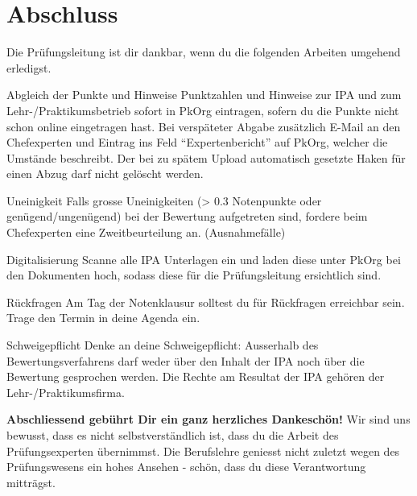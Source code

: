 \section{Abschluss}
Die Prüfungsleitung ist dir dankbar, wenn du die folgenden Arbeiten umgehend erledigst.

\begin{taskitemwithoutcomment}{Abgleich der Punkte und Hinweise}
  Punktzahlen und Hinweise zur IPA und zum Lehr-/Praktikumsbetrieb sofort in PkOrg eintragen, sofern du die Punkte nicht schon online eingetragen hast. Bei verspäteter Abgabe zusätzlich E-Mail an den Chefexperten und Eintrag ins Feld \enquote{Expertenbericht} auf PkOrg, welcher die Umstände beschreibt. Der bei zu spätem Upload automatisch gesetzte Haken für einen Abzug darf nicht gelöscht werden.
\end{taskitemwithoutcomment}
\begin{taskitemwithoutcomment}{Uneinigkeit}
  Falls grosse Uneinigkeiten (> 0.3 Notenpunkte oder genügend/ungenügend) bei der Bewertung aufgetreten sind, fordere beim Chefexperten eine Zweitbeurteilung an. (Ausnahmefälle)
\end{taskitemwithoutcomment}
\begin{taskitemwithoutcomment}{Digitalisierung}
  Scanne alle IPA Unterlagen ein und laden diese unter PkOrg bei den Dokumenten hoch, sodass diese für die Prüfungsleitung ersichtlich sind.
\end{taskitemwithoutcomment}
\begin{taskitemwithoutcomment}{Rückfragen}
  Am Tag der Notenklausur solltest du für Rückfragen erreichbar sein. Trage den Termin in deine Agenda ein.
\end{taskitemwithoutcomment}
\begin{taskitemwithoutcomment}{Schweigepflicht}
  Denke an deine Schweigepflicht: Ausserhalb des Bewertungsverfahrens darf weder über den Inhalt der IPA noch über die Bewertung gesprochen werden. Die Rechte am Resultat der IPA gehören der Lehr-/Praktikumsfirma.
\end{taskitemwithoutcomment}


\vspace*{2cm}

\textbf{Abschliessend gebührt Dir ein ganz herzliches Dankeschön!}
Wir sind uns bewusst, dass es nicht selbstverständlich ist, dass du die Arbeit des Prüfungsexperten übernimmst. Die Berufslehre geniesst nicht zuletzt wegen des Prüfungswesens ein hohes Ansehen - schön, dass du diese Verantwortung mitträgst.
